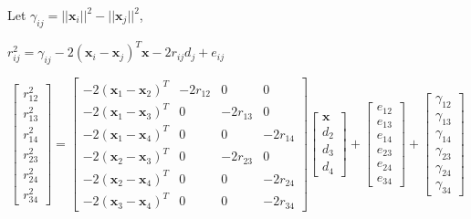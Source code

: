 \documentclass[a4 paper]{article}
\begin{document}
Let $\gamma_{ij} = ||\mathbf{x}_{i}||^{2} - ||\mathbf{x}_{j}||^{2} $,
\\ \centerline{$ r_{ij}^{2} = \gamma_{ij} - 2(\mathbf{x}_{i} - \mathbf{x}_{j})^{T}\mathbf{x} -2r_{ij}d_{j} + e_{ij} $}

\[
\begin{bmatrix}
	r_{12}^{2} \\ r_{13}^{2} \\ r_{14}^{2} \\ r_{23}^{2} \\ r_{24}^{2} \\ r_{34}^{2} 
\end{bmatrix}
= 
\begin{bmatrix}
- 2(\mathbf{x}_{1} - \mathbf{x}_{2})^{T} & -2r_{12} & 0 & 0  \\
- 2(\mathbf{x}_{1} - \mathbf{x}_{3})^{T} & 0 & -2r_{13} & 0  \\
- 2(\mathbf{x}_{1} - \mathbf{x}_{4})^{T} & 0 & 0 & -2r_{14}  \\
- 2(\mathbf{x}_{2} - \mathbf{x}_{3})^{T} & 0 & -2r_{23} & 0  \\
- 2(\mathbf{x}_{2} - \mathbf{x}_{4})^{T} & 0 & 0 & -2r_{24}  \\
- 2(\mathbf{x}_{3} - \mathbf{x}_{4})^{T} & 0 & 0 & -2r_{34}  
\end{bmatrix}
\begin{bmatrix}
\mathbf{x} \\ d_{2} \\ d_{3} \\ d_{4}
\end{bmatrix}
+
\begin{bmatrix}
e_{12} \\ e_{13} \\ e_{14} \\ e_{23} \\ e_{24} \\ e_{34} 
\end{bmatrix}
+
\begin{bmatrix}
\gamma_{12} \\ \gamma_{13} \\ \gamma_{14} \\ \gamma_{23} \\ \gamma_{24} \\ \gamma_{34} 
\end{bmatrix}
\]
\end{document}
